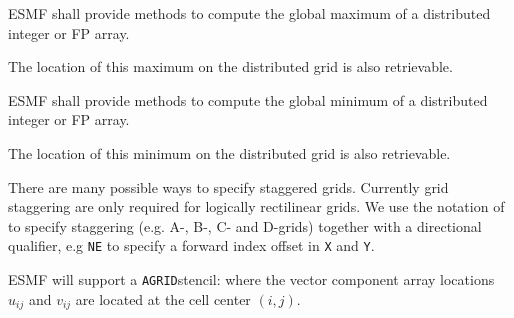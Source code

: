 



ESMF shall provide methods to compute the global maximum of a
distributed integer or FP array.


The location of this maximum on the distributed grid is also
retrievable.


ESMF shall provide methods to compute the global minimum of a
distributed integer or FP array.


The location of this minimum on the distributed grid is also
retrievable.


There are many possible ways to specify staggered grids.  Currently
grid staggering are only required for logically rectilinear grids. We
use the notation of \cite{ref:a1966} to specify staggering (e.g. A-,
B-, C- and D-grids) together with a directional qualifier, e.g
\texttt{NE} to specify a forward index offset in \texttt{X} and
\texttt{Y}.

\newcommand{\agrid}{\texttt{AGRID}{}}
\newcommand{\bgrid}{\texttt{BGRID}{}}
\newcommand{\cgrid}{\texttt{CGRID}{}}
\newcommand{\dgrid}{\texttt{DGRID}{}}

\sreq{\agrid}

ESMF will support a \agrid stencil: where the vector
component array locations $u_{ij}$ and $v_{ij}$ are located at the
cell center $(i,j)$.

\sreq{\bgrid}

